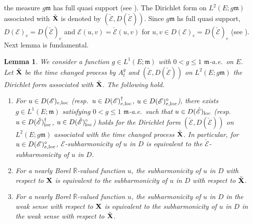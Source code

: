 \documentclass[12pt,a4paper]{article}
\newtheorem{lem}[thm]{Lemma}
\newcommand{\R}{\mathbb{R}}
\newcommand{\m}{\mathfrak{m} }
\newcommand{\loc}{{\rm loc}}
\newcommand{\1}{{\bf 1}}
\begin{document}
 the measure $g{\m}$ has full quasi support (see \cite[p.~190]{FOT}). 
 The Dirichlet form 
 on $L^2(E;g{\m})$ associated with $\check{\bf X}$ is denoted by
 $(\check{\mathscr{E}}, D(\check{\mathscr{E}}))$. 
 Since $g{\m}$ hs full quasi support, 
 $D(\mathscr{E})_e= D(\check{\mathscr{E}})_e$ and 
 $\mathscr{E}(u,v)=\check{\mathscr{E}}(u,v)$ for $u,v\in D(\mathscr{E})_e= D(\check{\mathscr{E}})_e$ (see \cite[(6.2.23)]{FOT}). 
 Next lemma is fundamental. 
 \begin{lem}\label{lem:TimeChange}
 We consider a function $g\in L^1(E;{\m})$ with $0<g\leq 1$ ${\m}$-a.e.~on $E$. Let $\check{\bf X}$ be the time changed process  by $A_t^g$ and 
 $(\check{\mathscr{E}},D(\check{\mathscr{E}}))$ on $L^2(E;g{\m})$ the  Dirichlet form associated with $\check{\bf X}$.   
 The following hold. 
 \begin{enumerate}
 \item[\rm(1)] For $u\in D(\mathscr{E})_{e,\loc}$ {\rm(}resp.~$u\in D(\mathscr{E})_{e,\loc}^{\dag}$, $u\in D(\mathscr{E})_{e,\loc}^{\diamond}${\rm)}, there exists 
 $g\in L^1(E;{\m})$ satisfying $0<g\leq 1$ ${\m}$-a.e.~such that 
 $u\in D(\check{\mathscr{E}})_{\loc}$ {\rm(}resp.~$u\in D(\check{\mathscr{E}})_{\loc}^{\dag}$, $u\in D(\check{\mathscr{E}})_{\loc}^{\diamond}${\rm)} holds for the Dirichlet form $(\check{\mathscr{E}}, D(\check{\mathscr{E}}))$ on $L^2(E;g{\m})$ associated with the time changed process $\check{\bf X}$. In particular, for $u\in D(\mathscr{E})_{e,\loc}^{\diamond}$, $\mathscr{E}$-subharmonicity of $u$ in $D$ is equivalent to the 
 $\check{\mathscr{E}}$-subharmonicity of $u$ in $D$.  
 \item[\rm(2)] For a nearly Borel $\overline{\R}$-valued function $u$, 
 the subharmonicity of $u$ in $D$ with respect to ${\bf X}$ is equivalent to 
 the subharmonicity of $u$ in $D$ with respect to $\check{\bf X}$.
 \item[\rm(3)] For a nearly Borel $\overline{\R}$-valued function $u$, 
 the subharmonicity of $u$ in $D$ in the weak sense with respect to ${\bf X}$ is equivalent to  the subharmonicity of $u$ in $D$ in the weak sense with respect to $\check{\bf X}$.
 \end{enumerate}
 \end{lem}
\end{document}
